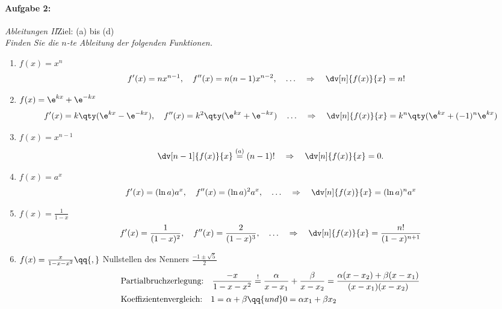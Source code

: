 \paragraph{Aufgabe 2: } \emph{Ableitungen II}\hfill Ziel: (a) bis (d)\\[0.2cm]
\emph{Finden Sie die $n$-te Ableitung der folgenden Funktionen.}
    \begin{enumerate}[label=(\alph*)]
        \setlength{\mathindent}{0cm}
        \item $f(x)=x^n$ 
        \begin{align}
            f'(x) &= n x^{n-1}, \quad f''(x) = n(n-1) x^{n-2}, \quad \hdots \quad \Rightarrow \quad \dv[n]{f(x)}{x} = n!
        \end{align}
        \item $f(x)=\e^{kx}+\e^{-kx}$
        \begin{align}
            f'(x) = k\qty(\e^{kx}-\e^{-kx}), \quad f''(x) = k^2 \qty(\e^{kx}+\e^{-kx})\quad \hdots \quad \Rightarrow \quad \dv[n]{f(x)}{x} = k^n \qty(\e^{kx} + (-1)^n \e^{kx})
        \end{align}
        \item $f(x)=x^{n-1}$
        \begin{align}
            \dv[n-1]{f(x)}{x} \overset{(a)}{=} (n-1)! \quad \Rightarrow \quad \dv[n]{f(x)}{x} = 0.
        \end{align}
        \item $f(x)=a^x$ 
        \begin{align}
            f'(x) = (\ln a) a^x, \quad f''(x) = (\ln a)^2 a^x, \quad \hdots \quad \Rightarrow \quad \dv[n]{f(x)}{x} = (\ln a)^n a^x
        \end{align}
        \item $f(x)=\frac{1}{1-x}$
        \begin{align}
            f'(x) = \frac{1}{(1-x)^2}, \quad f''(x) = \frac{2}{(1-x)^3}, \quad \hdots \quad \Rightarrow \quad \dv[n]{f(x)}{x} = \frac{n!}{(1-x)^{n+1}}
        \end{align}
        \item $f(x)=\frac{x}{1-x-x^2}\qq{,} $ Nullstellen des Nenners $\frac{-1\pm\sqrt{5}}{2}$  
        \begin{align}
            &\text{Partialbruchzerlegung:}\quad \frac{-x}{1-x-x^2} \overset{!}{=} \frac{\alpha}{x-x_1} + \frac{\beta}{x-x_2} = \frac{\alpha (x-x_2)+\beta (x-x_1)}{(x-x_1)(x-x_2)} \\
            &\text{Koeffizientenvergleich:}\quad 1 = \alpha + \beta \qq{und} 0 = \alpha x_1 + \beta x_2 \\

\end{align}
\end{enumerate}
